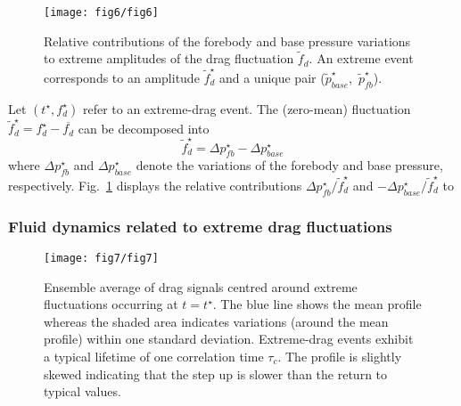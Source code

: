 \begin{figure}
	\centering
	\texttt{[image: fig6/fig6]}
	\caption{\label{fig:pressure_ratio} Relative contributions of the forebody and base pressure variations to extreme amplitudes of the drag fluctuation $\tilde f_d$. An extreme event corresponds to an amplitude $\tilde f^{\star}_d$ and a unique pair  ($\tilde{p}^{\star}_{base}$,~$\tilde{p}^{\star}_{fb}$).}
\end{figure}
%
%
Let $(t^{\star}, f_d^{\star})$ refer to an extreme-drag event.
The (zero-mean) fluctuation $\tilde{f}_d^{\star} = f_d^{\star} - \overline{f_d}$ can be  decomposed into 
\begin{equation}
\tilde{f}_d^{\star} = \Delta p_{fb}^{\star} - \Delta p_{base}^{\star}
\end{equation}
where $\Delta p_{fb}^{\star}$ and $\Delta p_{base}^{\star}$ denote the variations of the forebody and base pressure, respectively.
%
Fig.~\ref{fig:pressure_ratio} displays the relative contributions
$\Delta p_{fb}^{\star}/\tilde{f}_d^{\star}$ and $-\Delta p_{base}^{\star}/\tilde{f}_d^{\star}$ to 

\subsubsection{Fluid dynamics related to extreme drag fluctuations}
\label{sec:dynamical_aspects}

\begin{figure}
	\centering
	\texttt{[image: fig7/fig7]}
	\caption{\label{fig:timeseries_extremes} Ensemble average of drag signals centred around extreme fluctuations occurring  at $t=t^{\star}$. The blue line shows the mean profile whereas the shaded area indicates variations (around the mean profile) within one standard deviation. Extreme-drag events exhibit a typical lifetime of one correlation time $\tau_c$. The profile is slightly skewed indicating that the step up is slower than the return to typical values.}
\end{figure}

